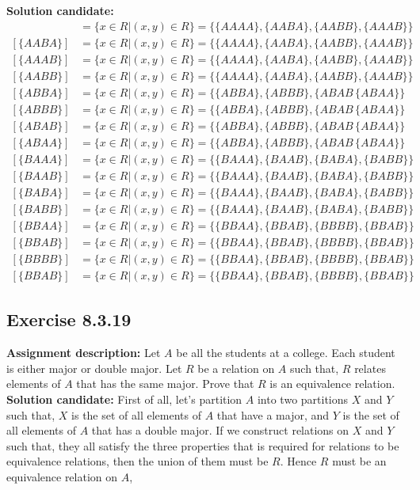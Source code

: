 \documentclass{report}
\newcommand{\mAlign}[1]{\begin{align*}#1\end{align*}}
\newcommand{\In}{\! \in \!}
\newcommand{\assignmentDescription}{\textbf{Assignment description: }}
\newcommand{\solution}{\textbf{Solution candidate: }}
\newcommand{\Exercise}[1]{\subsection{Exercise #1}}
\begin{document}
	\solution
	\mAlign{
		[\{AAAA\}] &= \{x \in R | (x,y) \In R\} = \{\{AAAA\},\{AABA\},\{AABB\},\{AAAB\}\} \\
		[\{AABA\}] &= \{x \in R | (x,y) \In R\} = \{\{AAAA\},\{AABA\},\{AABB\},\{AAAB\}\} \\
		[\{AAAB\}] &= \{x \in R | (x,y) \In R\} = \{\{AAAA\},\{AABA\},\{AABB\},\{AAAB\}\} \\
		[\{AABB\}] &= \{x \in R | (x,y) \In R\} = \{\{AAAA\},\{AABA\},\{AABB\},\{AAAB\}\} \\
		[\{ABBA\}] &= \{x \in R | (x,y) \In R\} = \{\{ABBA\},\{ABBB\},\{ABAB\,\{ABAA\}\} \\
		[\{ABBB\}] &= \{x \in R | (x,y) \In R\} = \{\{ABBA\},\{ABBB\},\{ABAB\,\{ABAA\}\} \\
		[\{ABAB\}] &= \{x \in R | (x,y) \In R\} = \{\{ABBA\},\{ABBB\},\{ABAB\,\{ABAA\}\} \\
		[\{ABAA\}] &= \{x \in R | (x,y) \In R\} = \{\{ABBA\},\{ABBB\},\{ABAB\,\{ABAA\}\} \\
		[\{BAAA\}] &= \{x \in R | (x,y) \In R\} = \{\{BAAA\},\{BAAB\},\{BABA\},\{BABB\}\} \\
		[\{BAAB\}] &= \{x \in R | (x,y) \In R\} = \{\{BAAA\},\{BAAB\},\{BABA\},\{BABB\}\} \\
		[\{BABA\}] &= \{x \in R | (x,y) \In R\} = \{\{BAAA\},\{BAAB\},\{BABA\},\{BABB\}\} \\
		[\{BABB\}] &= \{x \in R | (x,y) \In R\} = \{\{BAAA\},\{BAAB\},\{BABA\},\{BABB\}\} \\
		[\{BBAA\}] &= \{x \in R | (x,y) \In R\} = \{\{BBAA\},\{BBAB\},\{BBBB\},\{BBAB\}\} \\
		[\{BBAB\}] &= \{x \in R | (x,y) \In R\} = \{\{BBAA\},\{BBAB\},\{BBBB\},\{BBAB\}\} \\
		[\{BBBB\}] &= \{x \in R | (x,y) \In R\} = \{\{BBAA\},\{BBAB\},\{BBBB\},\{BBAB\}\} \\
		[\{BBAB\}] &= \{x \in R | (x,y) \In R\} = \{\{BBAA\},\{BBAB\},\{BBBB\},\{BBAB\}\}}
	
	\Exercise{8.3.19}
	\assignmentDescription
	Let $A$ be all the students at a college. Each student is either major or double major. Let $R$ be a relation on $A$ such that, $R$ relates elements of $A$ that has the same major. Prove that $R$ is an equivalence relation.\\
	
	\solution
	First of all, let's partition $A$ into two partitions $X$ and $Y$ such that, $X$ is the set of all elements of $A$ that have a major, and $Y$ is the set of all elements of $A$ that has a double major. If we construct relations on $X$ and $Y$ such that, they all satisfy the three properties that is required for relations to be equivalence relations, then the union of them must be $R$. Hence $R$ must be an equivalence relation on $A$, \\
	
\end{document}
